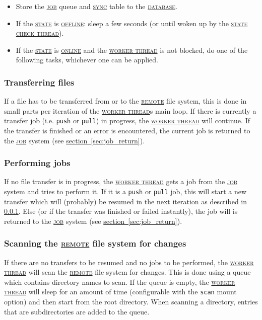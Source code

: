 \documentclass[a4paper]{article}
\newcommand{\keyword}[1]{\hyperref[keyword:#1]{\textsc{#1}}\xspace}
\newcommand{\job}{\keyword{job}}
\newcommand{\jobtype}[1]{\texttt{#1}\xspace}
\newcommand{\push}{\jobtype{push}}
\newcommand{\pull}{\jobtype{pull}}
\newcommand{\sync}{\keyword{sync}}
\newcommand{\remote}{\keyword{remote}}
\newcommand{\database}{\keyword{database}}
\newcommand{\state}{\keyword{state}}
\newcommand{\online}{\keyword{online}}
\newcommand{\offline}{\keyword{offline}}
\newcommand{\workerthread}{\hyperref[keyword:workerthread]{\textsc{worker thread}}\xspace}
\newcommand{\statecheckthread}{\hyperref[keyword:statecheckthread]{\textsc{state check thread}}\xspace}
\newcommand{\sectionref}[1]{\hyperref[#1]{section~\ref{#1}}}
\begin{document}
\begin{itemize}
	\item Store the \job queue and \sync table to the \database.
	\item If the \state is \offline: sleep a few seconds (or until woken up by
		the \statecheckthread).
	\item If the \state is \online and the \workerthread is not blocked, do one
			of the following tasks, whichever one can be applied.
\end{itemize}

\subsubsection{Transferring files} %
\label{sec:worker_transfer}
If a file has to be transferred from or to the \remote file system, this is done
in small parts per iteration of the \workerthread{}s main loop. If there is
currently a transfer job (i.e. \push or \pull) in progress, the
\workerthread will continue. If the transfer is finished or an error is
encountered, the current job is returned to the \job system (see
\sectionref{sec:job_return}).

\subsubsection{Performing jobs} %
\label{sec:worker_perform_job}
If no file transfer is in progress, the \workerthread gets a job from the \job
system and tries to perform it. If it is a \push or \pull job, this will start a
new transfer which will (probably) be resumed in the next iteration as described
in \ref{sec:worker_transfer}. Else (or if the transfer was finished or failed
instantly), the job will is returned to the \job system (see
\sectionref{sec:job_return}).

\subsubsection{Scanning the \remote file system for changes} %
\label{sec:worker_scan_remote}
If there are no transfers to be resumed and no jobs to be performed, the
\workerthread will scan the \remote file system for changes. This is done using
a queue which contains directory names to scan. If the queue is empty, the
\workerthread will sleep for an amount of time (configurable with the
\texttt{scan} mount option) and then start from the root directory. When
scanning a directory, entries that are subdirectories are added to the queue.
\end{document}
